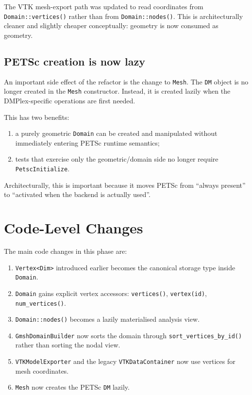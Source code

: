 The VTK mesh-export path was updated to read coordinates from
\texttt{Domain::vertices()} rather than from \texttt{Domain::nodes()}.
This is architecturally cleaner and slightly cheaper conceptually: geometry is
now consumed as geometry.

\subsection{PETSc creation is now lazy}

An important side effect of the refactor is the change to \texttt{Mesh}.  The
\texttt{DM} object is no longer created in the \texttt{Mesh} constructor.
Instead, it is created lazily when the DMPlex-specific operations are first
needed.

This has two benefits:

\begin{enumerate}[nosep]
  \item a purely geometric \texttt{Domain} can be created and manipulated
        without immediately entering PETSc runtime semantics;
  \item tests that exercise only the geometric/domain side no longer require
        \texttt{PetscInitialize}.
\end{enumerate}

Architecturally, this is important because it moves PETSc from
``always present'' to ``activated when the backend is actually used''.


\section{Code-Level Changes}
\label{sec:domain-vertex-transition-code}

The main code changes in this phase are:

\begin{enumerate}[nosep]
  \item \texttt{Vertex<Dim>} introduced earlier becomes the canonical
        storage type inside \texttt{Domain}.
  \item \texttt{Domain} gains explicit vertex accessors:
        \texttt{vertices()}, \texttt{vertex(id)}, \texttt{num\_vertices()}.
  \item \texttt{Domain::nodes()} becomes a lazily materialised analysis view.
  \item \texttt{GmshDomainBuilder} now sorts the domain through
        \texttt{sort\_vertices\_by\_id()} rather than sorting the nodal view.
  \item \texttt{VTKModelExporter} and the legacy \texttt{VTKDataContainer}
        now use vertices for mesh coordinates.
  \item \texttt{Mesh} now creates the PETSc \texttt{DM} lazily.
\end{enumerate}

